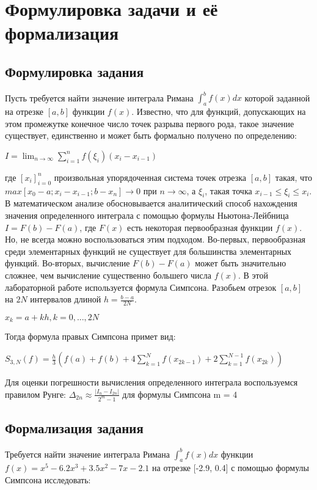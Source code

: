 \documentclass{article}
\begin{document}
	\newpage
	
	\section{Формулировка задачи и её формализация}
	\subsection{Формулировка задания}
	Пусть требуется найти значение интеграла Римана $\int_a^b f(x)dx$ которой заданной на отрезке $[a, b]$ функции $f(x)$. Известно, что для функций, допускающих на этом промежутке конечное число точек разрыва первого рода, такое значение существует, единственно и может быть формально получено по
	определению:

	$I =  \lim_{n\to\infty} \sum_{i=1}^{n} f(\xi_i) (x_i-x_{i-1}) $
	
	где $[x_i]^n_{i=0}$ произвольная упорядоченная система точек отрезка $[a,b]$ такая, что $max[x_0-a;x_i-x_{i-1};b-x_n] \to 0$ при $n \to \infty$, а $\xi_i$, такая точка $x_{i-1} \leq \xi_i \leq x_i$.
	В математическом анализе обосновывается аналитический способ нахождения значения определенного
	интеграла с помощью формулы Ньютона-Лейбница $I = F(b)-F(a)$, где $F(x)$ есть некоторая первообразная
	функции $f(x)$.
	Но, не всегда можно воспользоваться этим подходом. Во-первых, первообразная среди элементарных
	функций не существует для большинства элементарных функций. Во-вторых, вычисление $F(b)-F(a)$
	может быть значительно сложнее, чем вычисление существенно большего числа $f(x)$.
	В этой лабораторной работе используется формула Симпсона.
	Разобьем отрезок $[a,b]$ на $2N$ интервалов длиной $h = \frac{b-a}{2N}$.
	
	$x_k = a + kh, k = 0,...,2N$

	Тогда формула правых Симпсона примет вид:
	
	$S_{3,N}(f) = \frac{h}{3}(f(a)+f(b)+4\sum_{k=1}^{N}f(x_{2k-1})+2\sum_{k=1}^{N-1}f(x_{2k}))$
	
	Для оценки погрешности вычисления определенного интеграла воспользуемся правилом Рунге:
	$\Delta_{2n} \approx \frac{|I_n-I_{2n}|}{2^m-1}$
	для формулы Симпсона m = 4
	
	\subsection{Формализация задания}
		Требуется найти значение интеграла Римана $\int_a^b f(x)dx$ функции $f(x) = x^5 - 6.2x^3 + 3.5x^2 -7x -2.1$ на отрезке [-2.9, 0.4] с помощью формулы Симпсона исследовать:
	
\end{document}
